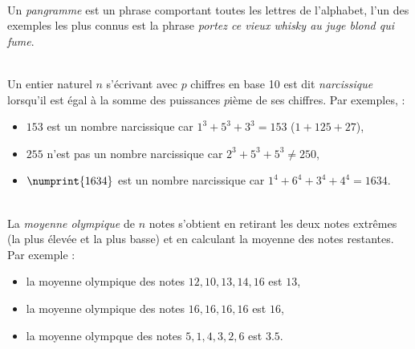 \documentclass[11pt,a4paper]{article}
\begin{document}
\begin{Exercise}[title = {pangramme}]\\
    Un \textit{pangramme} est un phrase comportant toutes les lettres de l'alphabet, l'un des exemples les plus connus est la phrase \og{} \textit{portez ce vieux whisky au juge blond qui fume}\fg{}. 
\end{Exercise}

\begin{Exercise}[title = {nombres narcissiques}]\\
    Un entier naturel $n$ s'écrivant avec $p$ chiffres en base 10 est dit \textit{narcissique} lorsqu'il est égal à la somme des puissances $p$ième de ses chiffres. Par exemples, :
    \begin{itemize}
    \item $153$ est un nombre narcissique car $1^3 + 5^3 + 3^3 = 153$ ($1 + 125 + 27$),
    \item $255$ n'est pas un nombre narcissique car $2^3 + 5^3 + 5^3 \neq 250$,
    \item $\numprint{1634}$ est un nombre narcissique car $1^4 + 6^4 + 3^4 + 4^4 = 1634$.
    \end{itemize}
\end{Exercise}

\begin{Exercise}[title = {moyenne olympique}]\\
 La \textit{moyenne olympique} de $n$ notes  s'obtient en retirant les deux notes extrêmes (la plus élevée et la plus basse) et en calculant la moyenne des notes restantes. Par exemple :
 \begin{itemize}
    \item la moyenne olympique des notes $12, 10, 13, 14, 16$ est $13$,
    \item la moyenne olympique des notes $16, 16, 16, 16$ est $16$,
    \item la moyenne olympque des notes $5, 1, 4, 3, 2, 6$ est $3.5$.
\end{itemize}

\end{Exercise}
\end{document}
